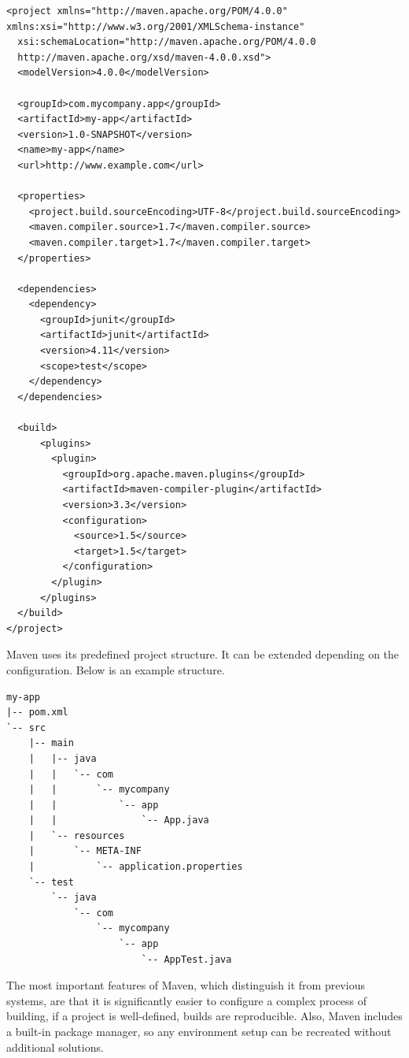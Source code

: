 \begin{lstlisting}[caption={Example of \texttt{pom.xml}}, label={buildsystem:pom-example}, caption={%
  Example of simple \texttt{pom.xm}l file \cite{POMFILE}%
}]
<project xmlns="http://maven.apache.org/POM/4.0.0" 
xmlns:xsi="http://www.w3.org/2001/XMLSchema-instance"
  xsi:schemaLocation="http://maven.apache.org/POM/4.0.0
  http://maven.apache.org/xsd/maven-4.0.0.xsd">
  <modelVersion>4.0.0</modelVersion>
 
  <groupId>com.mycompany.app</groupId>
  <artifactId>my-app</artifactId>
  <version>1.0-SNAPSHOT</version>
  <name>my-app</name>
  <url>http://www.example.com</url>
 
  <properties>
    <project.build.sourceEncoding>UTF-8</project.build.sourceEncoding>
    <maven.compiler.source>1.7</maven.compiler.source>
    <maven.compiler.target>1.7</maven.compiler.target>
  </properties>
 
  <dependencies>
    <dependency>
      <groupId>junit</groupId>
      <artifactId>junit</artifactId>
      <version>4.11</version>
      <scope>test</scope>
    </dependency>
  </dependencies>
 
  <build>
      <plugins>
        <plugin>
          <groupId>org.apache.maven.plugins</groupId>
          <artifactId>maven-compiler-plugin</artifactId>
          <version>3.3</version>
          <configuration>
            <source>1.5</source>
            <target>1.5</target>
          </configuration>
        </plugin>
      </plugins>
  </build>
</project>
\end{lstlisting}

Maven uses its predefined project structure. It can be extended
depending on the configuration. Below is an example structure.

\begin{verbatim}
my-app
|-- pom.xml
`-- src
    |-- main
    |   |-- java
    |   |   `-- com
    |   |       `-- mycompany
    |   |           `-- app
    |   |               `-- App.java
    |   `-- resources
    |       `-- META-INF
    |           `-- application.properties
    `-- test
        `-- java
            `-- com
                `-- mycompany
                    `-- app
                        `-- AppTest.java
\end{verbatim}

The most important features of Maven, which distinguish it from previous
systems, are that it is significantly easier to configure a complex
process of building, if a project is well-defined, builds are reproducible.
Also, Maven includes a built-in package manager, so any environment setup
can be recreated without additional solutions.

